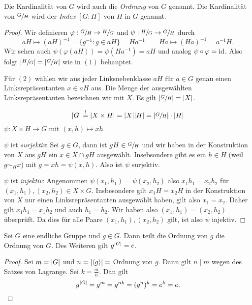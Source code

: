 \begin{definition}
	Die Kardinalität von $G$ wird auch die \emph{Ordnung} von $G$ genannt.
	Die Kardinalität von $\sfrac{G}{H}$ wird der \emph{Index $[G:H]$} von $H$ in $G$ genannt.
\end{definition}

\begin{proof}
	Wir definieren $\varphi: \sfrac{G}{H} \to \sfrac{H}{G}$ und $\psi: \sfrac{H}{G} \to \sfrac{G}{H}$ durch
	\[
		a H \mapsto (a H)^{-1} = \{g^{-1}: g \in a H\} = H a^{-1} \qquad H a \mapsto (Ha)^{-1} = a^{-1} H
	.\] 
	Wir sehen auch $\psi(\varphi(aH)) = \psi(H a^{-1}) = a H $ und analog $\psi \circ \varphi = \operatorname{id}$.
	Also folgt $\abs{\sfrac{H}{G}} = \abs{\sfrac{G}{H}}$ wie in $(1)$ behauptet.

	Für $(2)$ wählen wir aus jeder Linksnebenklasse $a H$ für $a \in G$ genau einen Linksrepräsentanten
	$x \in a H$ aus. Die Menge der ausgewählten Linksrepräsentanten bezeichnen wir mit $X$. Es gilt  $\abs{\sfrac{G}{H}} = \abs{X}$.
	\begin{claim}
		\[
			\abs{G} \stackrel{!}{=} \abs{X \times  H} = \abs{X} \abs{H} = \abs{\sfrac{G}{H}} \cdot \abs{H}
		\]
		$\psi: X \times  H \to G$ mit $(x,h) \mapsto  x h $
	\end{claim}
	$\psi$ ist \emph{surjektiv}: Sei $g \in G$, dann ist $gH \in \sfrac{G}{H}$ und wir haben in der Konstruktion von $X$ aus $g H$ ein $x \in X \cap g H$ 
	ausgewählt. Insebsondere gibt es ein $h \in H$ (weil $g \sim_{H} x$) mit $g = xh = \psi(x,h)$. Also ist $\psi$ surjektiv.

	$\psi$ ist \emph{injektiv}: Angenommen $\psi(x_1,h_1) = \psi(x_2,h_2)$ also $x_1 h_1 = x_2 h_2$ für $(x_1,h_1),(x_2,h_2) \in X \times G$.
	Insbesondere gilt $x_1 H = x_2 H$ in der Konstruktion von $X$ nur einen Linksrepräsentanten ausgewählt haben,
	gilt also $x_1 = x_2$. Daher gilt $x_1 h_1 = x_1 h_2$ und auch $h_1 = h_2$. 
	Wir haben also $(x_1,h_1) = (x_2,h_2)$ überprüft. Da dies für alle Paare $(x_1,h_1),(x_2,h_2)$ gilt, ist also $\psi$ injektiv.
\end{proof}

\begin{corollary}
	Sei $G$ eine endliche Gruppe und $g \in G$. Dann teilt die Ordnung von $g$ die Ordnung von $G$.
	Des Weiteren gilt $g^{\abs{G}} = e$.
\end{corollary}

\begin{proof}
	Sei $m = \abs{G}$ und $n = \abs{\left< g \right>} =$ Ordnung von $g$.
	Dann gilt $n \mid m$ wegen des Satzes von Lagrange.
	Sei $k = \frac{m}{n}$. Dan gilt
	\[
		g^{\abs{G}} = g^{m} = g^{nk} = (g^{n})^{k} = e^{k} = e
	.\] 
\end{proof}

